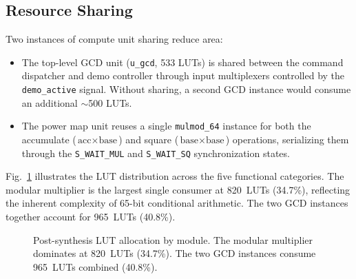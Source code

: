 \documentclass[lettersize,journal]{IEEEtran}
\begin{document}
\subsection{Resource Sharing}

Two instances of compute unit sharing reduce area:
\begin{itemize}
\item The top-level GCD unit (\texttt{u\_gcd}, 533 LUTs) is shared between the command dispatcher and demo controller through input multiplexers controlled by the \texttt{demo\_active} signal. Without sharing, a second GCD instance would consume an additional $\sim$500 LUTs.
\item The power map unit reuses a single \texttt{mulmod\_64} instance for both the accumulate ($\text{acc} \times \text{base}$) and square ($\text{base} \times \text{base}$) operations, serializing them through the \texttt{S\_WAIT\_MUL} and \texttt{S\_WAIT\_SQ} synchronization states.
\end{itemize}

Fig.~\ref{fig:lutbar} illustrates the LUT distribution across the five functional categories. The modular multiplier is the largest single consumer at 820~LUTs (34.7\%), reflecting the inherent complexity of 65-bit conditional arithmetic. The two GCD instances together account for 965~LUTs (40.8\%).

\begin{figure}[!t]
\centering
{}
\caption{Post-synthesis LUT allocation by module. The modular multiplier dominates at 820~LUTs (34.7\%). The two GCD instances consume 965~LUTs combined (40.8\%).}
\label{fig:lutbar}
\end{figure}
\end{document}
